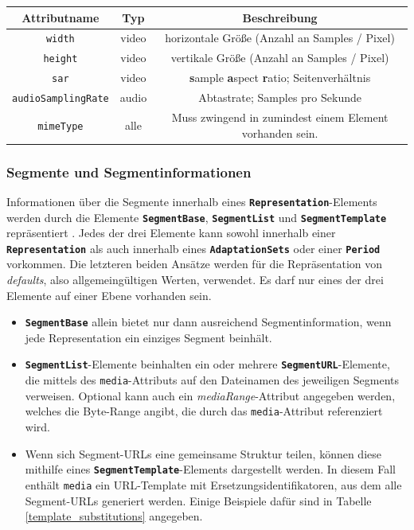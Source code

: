 \documentclass[paper = a4, fontsize = 12pt, parskip = half]{scrartcl} %
\def\attr#1{\texttt{#1}}
\def\elem#1{\texttt{\textbf{#1}}}
\begin{document}
\begin{center}
	\begin{tabular}{| c | c | c |}
		\hline
		\textbf{Attributname} & \textbf{Typ} & \textbf{Beschreibung}                                            \\
		\hline
		\hline
		\attr{width}                 & video        & horizontale Größe (Anzahl an Samples / Pixel)                    \\
		\hline
		\attr{height}                & video        & vertikale Größe (Anzahl an Samples / Pixel)                      \\
		\hline
		\attr{sar}                   & video        & \textbf{s}ample \textbf{a}spect \textbf{r}atio; Seitenverhältnis \\
		\hline
		\attr{audioSamplingRate}     & audio        & Abtastrate; Samples pro Sekunde                                    \\
		\hline
		\attr{mimeType}              & alle         & Muss zwingend in zumindest einem Element vorhanden sein.         \\
		\hline
	\end{tabular}
\end{center}

\subsubsection{Segmente und Segmentinformationen}
Informationen über die Segmente innerhalb eines \elem{Representation}-Elements werden durch die Elemente \elem{SegmentBase}, \elem{SegmentList} und \elem{SegmentTemplate} repräsentiert \cite{international_organization_for_standardization_isoiec_nodate}. Jedes der drei Elemente kann sowohl innerhalb einer \elem{Representation} als auch innerhalb eines \elem{AdaptationSets} oder einer \elem{Period} vorkommen. Die letzteren beiden Ansätze werden für die Repräsentation von \textit{defaults}, also allgemeingültigen Werten, verwendet. Es darf nur eines der drei Elemente auf einer Ebene vorhanden sein.

\begin{itemize}
	\item \elem{SegmentBase} allein bietet nur dann ausreichend Segmentinformation, wenn jede Representation ein einziges Segment beinhält.
	\item \elem{SegmentList}-Elemente beinhalten ein oder mehrere \elem{SegmentURL}-Elemente, die mittels des \attr{media}-Attributs auf den Dateinamen des jeweiligen Segments verweisen. Optional kann auch ein \textit{mediaRange}-Attribut angegeben werden, welches die Byte-Range angibt, die durch das \attr{media}-Attribut referenziert wird.
	\item Wenn sich Segment-URLs eine gemeinsame Struktur teilen, können diese mithilfe eines \elem{SegmentTemplate}-Elements dargestellt werden. In diesem Fall enthält \attr{media} ein URL-Template mit Ersetzungsidentifikatoren, aus dem alle Segment-URLs generiert werden. Einige Beispiele dafür sind in Tabelle \ref{template_substitutions} angegeben. 
\end{itemize}
\end{document}
